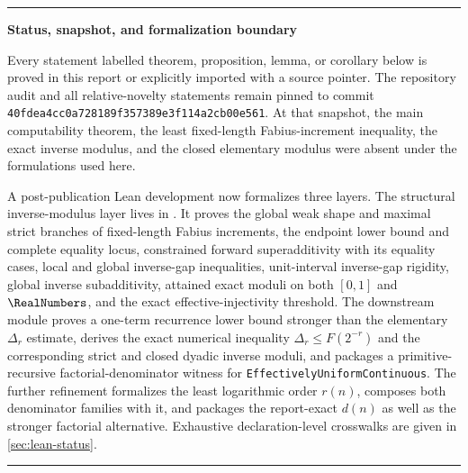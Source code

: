 \documentclass[11pt,oneside]{article}
\theoremstyle{definition}
\theoremstyle{remark}
\numberwithin{equation}{section}
\newcommand{\arrivalcommit}{\nolinkurl{40fdea4cc0a728189f357389e3f114a2cb00e561}}
\newenvironment{statusbox}[1]{%
  \par\smallskip\noindent\begin{center}\begin{minipage}{0.94\textwidth}%
  \color{black}\hrule\vspace{0.55em}\small\noindent\textbf{#1}\par\smallskip
}{%
  \vspace{0.55em}\hrule\end{minipage}\end{center}\smallskip
}
\begin{document}
\begin{abstract}
The report audits the recursive LaTeX corpus under
, separates imported
repository results from the arguments proved here, relates the construction to
$q$-binomial and sinc-product representations, Lambert-$W$ inverse asymptotics,
Legendre expansions, and Bell/Bernoulli coefficient calculi.  It records both
the completed post-publication Lean crosswalks for the structural inverse
modulus and effective uniform continuity, and the remaining roadmap for a
computable name-transformer.  An
exact-rational Python supplement reproduces the finite-spline and modulus
calculations.
\end{abstract}

\begin{statusbox}{Status, snapshot, and formalization boundary}
Every statement labelled theorem, proposition, lemma, or corollary below is
proved in this report or explicitly imported with a source pointer.  The
repository audit and all relative-novelty statements remain pinned to commit
\arrivalcommit.  At that snapshot, the main computability theorem, the least
fixed-length Fabius-increment inequality, the exact inverse modulus, and the
closed elementary modulus were absent under the formulations used here.

A post-publication Lean development now formalizes three layers.  The structural
inverse-modulus layer lives in
.  It
proves the global weak shape and maximal strict branches of fixed-length
Fabius increments, the endpoint lower bound and complete equality locus,
constrained forward superadditivity with its equality cases, local and global
inverse-gap inequalities, unit-interval inverse-gap rigidity, global inverse
subadditivity, attained exact moduli on both $[0,1]$ and $\RealNumbers$, and the exact
effective-injectivity threshold.  The downstream module
proves a one-term recurrence lower bound stronger than the elementary
$\Delta_r$ estimate, derives the exact numerical inequality
$\Delta_r\le F(2^{-r})$ and the corresponding strict and closed dyadic inverse
moduli, and packages a primitive-recursive factorial-denominator witness for
\texttt{EffectivelyUniformContinuous}.  The further refinement
formalizes the least logarithmic order $r(n)$, composes both denominator
families with it, and packages the report-exact $d(n)$ as well as the stronger
factorial alternative.  Exhaustive declaration-level crosswalks are given in
\cref{sec:lean-status}.


\end{statusbox}
\end{document}
